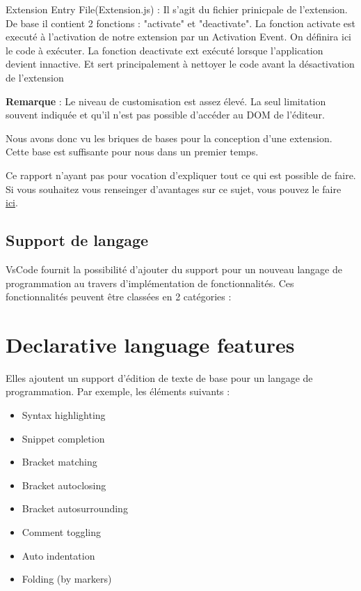 \documentclass[
    iict, %
    il, %
]{heig-tb}
\begin{document}
Extension Entry File(Extension.js) :
Il s'agit du fichier prinicpale de l'extension.
De base il contient 2 fonctions : "activate" et "deactivate".
La fonction activate est executé à l'activation de notre extension par un Activation Event. On définira ici le code à exécuter.
La fonction deactivate  ext exécuté lorsque l'application devient innactive. Et sert principalement à nettoyer le code avant la désactivation de l'extension

\textbf{Remarque} : Le niveau de customisation est assez élevé. La seul limitation souvent indiquée et qu'il n'est pas possible d'accéder au DOM de l'éditeur.

Nous avons donc vu les briques de bases pour la conception d'une extension. Cette base est suffisante pour nous dans un premier temps.

Ce rapport n'ayant pas pour vocation d'expliquer tout ce qui est possible de faire. Si vous souhaitez vous renseinger d'avantages sur ce sujet, vous pouvez le faire \href{https://code.visualstudio.com/api}{ici}.

\subsection{Support de langage}
VsCode fournit la possibilité d'ajouter du support pour un nouveau langage de programmation au travers d'implémentation de fonctionnalités. Ces fonctionnalités peuvent être classées en 2 catégories :

\section{Declarative language features}
Elles ajoutent un support d'édition de texte de base pour un langage de programmation.
Par exemple, les éléments suivants :

\begin{itemize}
    \item Syntax highlighting
    \item Snippet completion
    \item Bracket matching
    \item Bracket autoclosing
    \item Bracket autosurrounding
    \item Comment toggling
    \item Auto indentation
    \item Folding (by markers)
\end{itemize}
\end{document}
